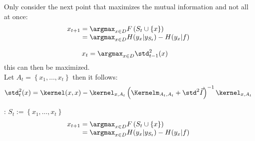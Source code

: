 \begin{defnbox}\nospacing
  \begin{defn}\label{defn:greedy_mutual_information_maximization_objective}
    Only consider the next point that maximizes the mutual information and not all at once:
    \begin{align}
          x_{t+1}&=\argmax_{x\in D}F \left(S_{t}\cup \left\{x\right\}\right)\nonumber\\[-1\jot]
                 &=\argmax_{x\in D}H(y_x|y_{S_t})-H(y_x|f)
    \end{align}
  \end{defn}
\end{defnbox}
\begin{corbox}\nospacing
  \begin{cor}\label{cor:mutal_information_maximization_homoscedactic_gaussian}
    \begin{align}
      x_{t}&=\argmax_{x\in D}\std_{t-1}^2(x)
    \end{align}
    this can then be maximized.\\
    Let $A_{t}=\left\{x_{1},\ldots,x_{t}\right\}$ then it follows:
    \begin{align}
      \std^2_t(x)=\kernel(x,x)-\kernel_{x,A_t}\left(\Kernelm_{A_t,A_t}+\std^2\vec{I}\right)^{-1}\kernel_{x,A_t}
    \end{align}
  \end{cor}
\end{corbox}
\begin{algorithmbox}
  \begin{algo}\label{algo:greedy_mutual_information_maximization}
    \begin{algorithmic}[1]
      \item[] : $S_{t}:=\left\{x_{1},\ldots,x_{t}\right\}$
        \begin{align*}
          x_{t+1}&=\argmax_{x\in D}F \left(S_{t}\cup \left\{x\right\}\right)\\[-1\jot]
                 &=\argmax_{x\in D}H(y_x|y_{S_t})-H(y_x|f)
        \end{align*}
      \EndFor
    \end{algorithmic}
  \end{algo}
\end{algorithmbox}
